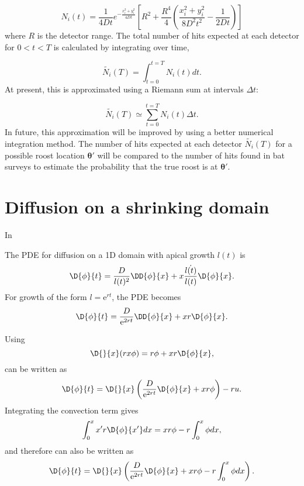 \begin{equation}
  N_i(t) = \frac{1}{4Dt} e^{-\frac{x_i^2 + y_i^2}{4Dt}} \left[ R^2 + \frac{R^4}{4} \left( \frac{x_i^2 + y_i^2}{8D^2t^2} - \frac{1}{2Dt} \right)\right]
\end{equation}
%
where $R$ is the detector range. The total number of hits expected at each
detector for $0 < t < T$ is calculated by integrating over time,

\begin{equation}
  \tilde{N_i}(T) = \int_{t=0}^{t=T} N_i(t) dt.
\end{equation}
%
At present, this is approximated using a Riemann sum at intervals $\Delta t$:

\begin{equation}
  \tilde{N_i}(T) \simeq \sum_{t=0}^{t=T} N_i(t) \Delta t.
  \label{eqn:expect_hits}
\end{equation}
%
In future, this approximation will be improved by using a better numerical
integration method. The number of hits expected at each detector $\tilde{N_i}(T)$ for a possible roost location $\bm{\theta'}$ will be compared to the number of hits found in bat surveys to estimate the probability that the true roost is at $\bm{\theta'}$.

\section{Diffusion on a shrinking domain}

In \cite{woolley2011stochastic}

The PDE for diffusion on a 1D domain with apical growth $l(t)$ is
%
\begin{equation}
\D{\phi}{t} = \frac{D}{l(t)^2} \DD{\phi}{x} + x \frac{\dot{l(t)}}{l(t)} \D{\phi}{x} .
\end{equation}
%
For growth of the form $l = \mathrm{e}^{rt}$, the PDE becomes
%
\begin{equation}
\D{\phi}{t} = \frac{D}{\mathrm{e}^{2rt}} \DD{\phi}{x} + x r \D{\phi}{x} .
\label{eqn:exp_apical}
\end{equation}

Using
%
\begin{equation}
\D{}{x} (rx\phi) = r\phi + xr \D{\phi}{x},
\end{equation}
%
 can be written as
%
\begin{equation}
\D{\phi}{t} = \D{}{x}\left( \frac{D}{\mathrm{e}^{2rt}}\D{\phi}{x} + xr \phi \right) - ru .
\end{equation}
%
Integrating the convection term gives
\begin{equation}
\int_0^x x'r\D{\phi}{x'} dx = xr\phi - r\int_0^x \phi dx ,
\end{equation}
%
and therefore  can also be written as
%
\begin{equation}
\D{\phi}{t} = \D{}{x}\left( \frac{D}{\mathrm{e}^{2rt}}\D{\phi}{x} + xr \phi - r\int_0^x \phi dx \right) .
\end{equation}



